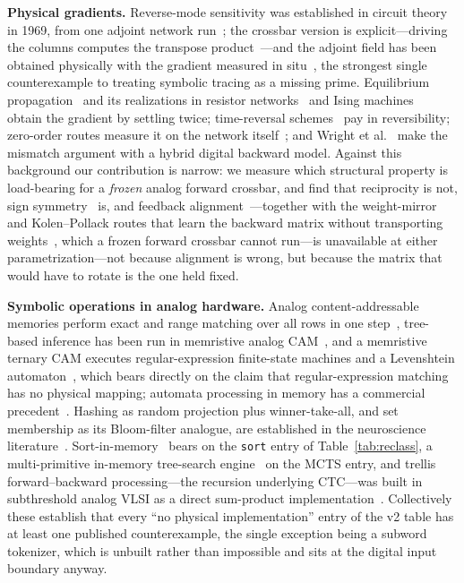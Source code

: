 \documentclass[11pt]{article}
\begin{document}
\textbf{Physical gradients.} Reverse-mode sensitivity was established in circuit theory in 1969, from one adjoint network run~\cite{director1969}; the crossbar version is explicit---driving the columns computes the transpose product~\cite{gokmen2016}---and the adjoint field has been obtained physically with the gradient measured in situ~\cite{hughes2018}, the strongest single counterexample to treating symbolic tracing as a missing prime. Equilibrium propagation~\cite{scellier2017} and its realizations in resistor networks~\cite{dillavou2022} and Ising machines~\cite{laydevant2024} obtain the gradient by settling twice; time-reversal schemes~\cite{lopezpastor2023} pay in reversibility; zero-order routes measure it on the network itself~\cite{cauwenberghs1996,baydin2022,leblanc1922,krstic2000}; and Wright et al.~\cite{wright2022} make the mismatch argument with a hybrid digital backward model. Against this background our contribution is narrow: we measure which structural property is load-bearing for a \textit{frozen} analog forward crossbar, and find that reciprocity is not, sign symmetry~\cite{liao2016,xiao2018} is, and feedback alignment~\cite{lillicrap2016}---together with the weight-mirror and Kolen--Pollack routes that learn the backward matrix without transporting weights~\cite{akrout2019}, which a frozen forward crossbar cannot run---is unavailable at either parametrization---not because alignment is wrong, but because the matrix that would have to rotate is the one held fixed.

\textbf{Symbolic operations in analog hardware.} Analog content-addressable memories perform exact and range matching over all rows in one step~\cite{li2020acam}, tree-based inference has been run in memristive analog CAM~\cite{pedretti2021}, and a memristive ternary CAM executes regular-expression finite-state machines and a Levenshtein automaton~\cite{graves2020tcam}, which bears directly on the claim that regular-expression matching has no physical mapping; automata processing in memory has a commercial precedent~\cite{dlugosch2014}. Hashing as random projection plus winner-take-all, and set membership as its Bloom-filter analogue, are established in the neuroscience literature~\cite{dasgupta2017,dasgupta2018}. Sort-in-memory~\cite{yu2025sort} bears on the \texttt{sort} entry of Table~\ref{tab:reclass}, a multi-primitive in-memory tree-search engine~\cite{molomochir2026} on the MCTS entry, and trellis forward--backward processing---the recursion underlying CTC---was built in subthreshold analog VLSI as a direct sum-product implementation~\cite{loeliger2001}. Collectively these establish that every ``no physical implementation'' entry of the v2 table has at least one published counterexample, the single exception being a subword tokenizer, which is unbuilt rather than impossible and sits at the digital input boundary anyway.
\end{document}
